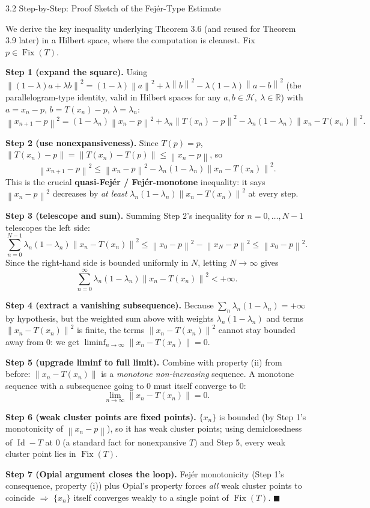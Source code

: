 \documentclass[aspectratio=169,10pt]{beamer}
\newcommand{\cH}{\mathcal{H}}
\newcommand{\Fix}{\operatorname{Fix}}
\newcommand{\R}{\mathbb{R}}
\newcommand{\norm}[1]{\left\|#1\right\|}
\begin{document}
\begin{frame}[allowframebreaks]{3.2 Step-by-Step: Proof Sketch of the Fej\'er-Type Estimate}

  We derive the key inequality underlying Theorem 3.6 (and reused for
  Theorem 3.9 later) in a Hilbert space, where the computation is
  cleanest. Fix $p\in\Fix(T)$.

  \textbf{Step 1 (expand the square).} Using
  $\norm{(1-\lambda)a+\lambda b}^2=(1-\lambda)\norm{a}^2+\lambda\norm{b}^2
  -\lambda(1-\lambda)\norm{a-b}^2$ (the parallelogram-type identity, valid
  in Hilbert spaces for any $a,b\in\cH,\ \lambda\in\R$) with
  $a=x_n-p$, $b=T(x_n)-p$, $\lambda=\lambda_n$:
  $$\norm{x_{n+1}-p}^2=(1-\lambda_n)\norm{x_n-p}^2+\lambda_n\norm{T(x_n)-p}^2
    -\lambda_n(1-\lambda_n)\norm{x_n-T(x_n)}^2.$$

  \textbf{Step 2 (use nonexpansiveness).} Since $T(p)=p$,
  $\norm{T(x_n)-p}=\norm{T(x_n)-T(p)}\le\norm{x_n-p}$, so
  $$\norm{x_{n+1}-p}^2\le\norm{x_n-p}^2-\lambda_n(1-\lambda_n)\norm{x_n-T(x_n)}^2.$$
  This is the crucial \textbf{quasi-Fej\'er / Fej\'er-monotone}
  inequality: it says $\norm{x_n-p}^2$ decreases by \emph{at least}
  $\lambda_n(1-\lambda_n)\norm{x_n-T(x_n)}^2$ at every step.

  \framebreak

  \textbf{Step 3 (telescope and sum).} Summing Step 2's inequality for
  $n=0,\dots,N-1$ telescopes the left side:
  $$\sum_{n=0}^{N-1}\lambda_n(1-\lambda_n)\norm{x_n-T(x_n)}^2
    \le\norm{x_0-p}^2-\norm{x_N-p}^2 \le \norm{x_0-p}^2.$$
  Since the right-hand side is bounded uniformly in $N$, letting
  $N\to\infty$ gives
  $$\sum_{n=0}^{\infty}\lambda_n(1-\lambda_n)\norm{x_n-T(x_n)}^2<+\infty.$$

  \textbf{Step 4 (extract a vanishing subsequence).} Because
  $\sum_n\lambda_n(1-\lambda_n)=+\infty$ by hypothesis, but the weighted
  sum above with weights $\lambda_n(1-\lambda_n)$ and terms
  $\norm{x_n-T(x_n)}^2$ is finite, the terms $\norm{x_n-T(x_n)}^2$
  cannot stay bounded away from $0$: we get
  $\liminf_{n\to\infty}\norm{x_n-T(x_n)}=0$.

  \framebreak

  \textbf{Step 5 (upgrade liminf to full limit).} Combine with property
  (ii) from before: $\norm{x_n-T(x_n)}$ is a \emph{monotone
  non-increasing} sequence. A monotone sequence with a subsequence
  going to $0$ must itself converge to $0$:
  $$\lim_{n\to\infty}\norm{x_n-T(x_n)}=0.$$

  \textbf{Step 6 (weak cluster points are fixed points).} $\{x_n\}$ is
  bounded (by Step 1's monotonicity of $\norm{x_n-p}$), so it has weak
  cluster points; using demiclosedness of $\operatorname{Id}-T$ at $0$
  (a standard fact for nonexpansive $T$) and Step 5, every weak cluster
  point lies in $\Fix(T)$.

  \textbf{Step 7 (Opial argument closes the loop).} Fej\'er monotonicity
  (Step 1's consequence, property (i)) plus Opial's property forces
  \emph{all} weak cluster points to coincide $\Rightarrow$ $\{x_n\}$
  itself converges weakly to a single point of $\Fix(T)$. $\blacksquare$
\end{frame}
\end{document}
